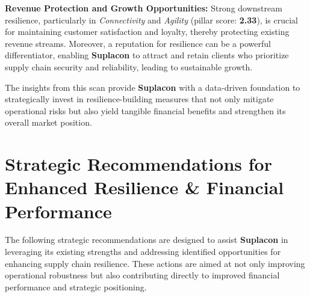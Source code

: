 \documentclass[
  oneside,
  open=any,
  fontsize=11pt]{scrbook}
\begin{document}
\textbf{Revenue Protection and Growth Opportunities:} Strong downstream
resilience, particularly in \emph{Connectivity} and \emph{Agility}
(pillar score: \textbf{2.33}), is crucial for maintaining customer
satisfaction and loyalty, thereby protecting existing revenue streams.
Moreover, a reputation for resilience can be a powerful differentiator,
enabling \textbf{Suplacon} to attract and retain clients who prioritize
supply chain security and reliability, leading to sustainable growth.

The insights from this scan provide \textbf{Suplacon} with a data-driven
foundation to strategically invest in resilience-building measures that
not only mitigate operational risks but also yield tangible financial
benefits and strengthen its overall market position.

\chapter{Strategic Recommendations for Enhanced Resilience \& Financial
Performance}\label{strategic-recommendations-for-enhanced-resilience-financial-performance}

The following strategic recommendations are designed to assist
\textbf{Suplacon} in leveraging its existing strengths and addressing
identified opportunities for enhancing supply chain resilience. These
actions are aimed at not only improving operational robustness but also
contributing directly to improved financial performance and strategic
positioning.
\end{document}

